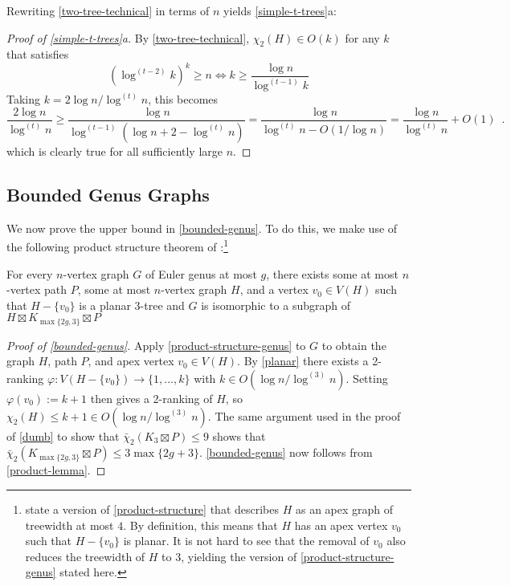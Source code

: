 \documentclass[kpfonts]{patmorin}
\newcommand{\trn}{\chi_2}
\newcommand{\dtcn}{\bar{\chi}_2}
\theoremstyle{named}
\newcommand{\weirdref}[2]{\cref{#1}#2}
\begin{document}
Rewriting \cref{two-tree-technical} in terms of $n$ yields \weirdref{simple-t-trees}{a}:

\begin{proof}[Proof of \weirdref{simple-t-trees}{a}]
    By \cref{two-tree-technical}, $\trn(H)\in O(k)$ for any $k$ that satisfies
    \[  (\log^{(t-2)} k)^{k} \ge n \Leftrightarrow
        k \ge \frac{\log n}{\log^{(t-1)} k}
    \]
    Taking $k=2\log n/\log^{(t)} n$, this becomes
    \[
        \frac{2\log n}{\log^{(t)} n}
        \ge \frac{\log n}{\log^{(t-1)}(\log n + 2 -\log^{(t)} n)}
        = \frac{\log n}{\log^{(t)} n - O(1/\log n)}
        = \frac{\log n}{\log^{(t)} n}+O(1) \enspace .
    \]
    which is clearly true for all sufficiently large $n$.
\end{proof}


\subsection{Bounded Genus Graphs}

We now prove the upper bound in \cref{bounded-genus}. To do this, we make use of the following product structure theorem of \citet{dujmovic.joret.ea:planar}:\footnote{\citet{dujmovic.joret.ea:planar} state a version of \cref{product-structure} that describes $H$ as an apex graph of treewidth at most $4$.  By definition, this means that $H$ has an apex vertex $v_0$ such that $H-\{v_0\}$ is planar.  It is not hard to see that the removal of $v_0$ also reduces the treewidth of $H$ to 3, yielding the version of \cref{product-structure-genus} stated here.}

\begin{thm} \label{product-structure-genus}
    For every $n$-vertex graph $G$ of Euler genus at most $g$, there exists some at most $n$-vertex path $P$, some at most $n$-vertex graph $H$, and a vertex $v_0\in V(H)$ such that $H-\{v_0\}$ is a planar 3-tree and $G$ is isomorphic to a subgraph of $H\boxtimes K_{\max\{2g,3\}}\boxtimes P$
\end{thm}

\begin{proof}[Proof of \cref{bounded-genus}]
    Apply \cref{product-structure-genus} to $G$ to obtain the graph $H$, path $P$, and apex vertex $v_0\in V(H)$.  By \cref{planar} there exists a 2-ranking $\varphi:V(H-\{v_0\})\to \{1,\ldots,k\}$ with $k\in O(\log n/\log^{(3)} n)$. Setting $\varphi(v_0):=k+1$ then gives a 2-ranking of $H$, so $\trn(H)\le k+1\in O(\log n/\log^{(3)} n)$.  The same argument used in the proof of \cref{dumb} to show that $\dtcn(K_3\boxtimes P)\le 9$ shows that $\dtcn(K_{\max\{2g,3\}}\boxtimes P)\le 3\max\{2g+3\}$.  \cref{bounded-genus} now follows from \cref{product-lemma}.
\end{proof}
\end{document}
